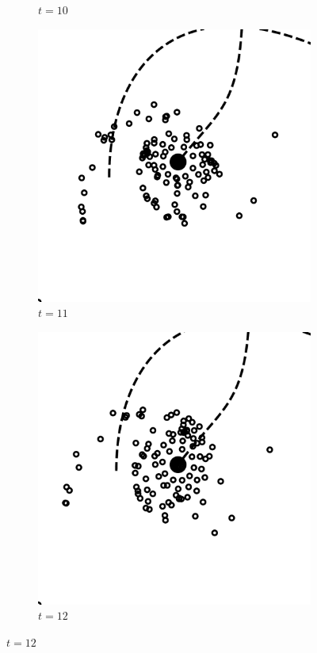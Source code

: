 \documentclass[11pt,twocolumn]{article}
\begin{document}
\begin{figure}[!htbp]
\begin{subfigure}[b]{0.2\textwidth}
    				\caption{$t = 10$}
  			\end{subfigure}
            \hfill
            \begin{subfigure}[b]{0.2\textwidth}
    			\includegraphics[width=\textwidth]{fig_4/Fig4_11_000000_0.pdf}
    				\caption{$t = 11$}
  			\end{subfigure}
            \hfill
            \begin{subfigure}[b]{0.2\textwidth}
    			\includegraphics[width=\textwidth]{fig_4/Fig4_12_000000_0.pdf}
    			\caption{$t = 12$}
                \label{fig:fig4h}
  			\end{subfigure}
            

\end{figure}
\end{document}
